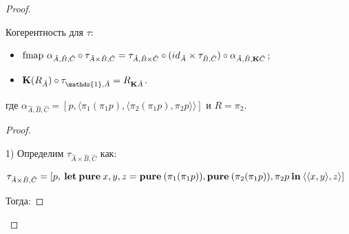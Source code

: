 \begin{proof}
\begin{lemma} Когерентность для $\tau$:

  \begin{itemize}
    \item $\text{fmap } \alpha_{\hat{A},\hat{B},\hat{C}} \circ \tau_{\hat{A} \times \hat{B}, \hat{C}} = \tau_{\hat{A}, \hat{B} \times \hat{C}} \circ (id_{\hat{A}} \times \tau_{\hat{B}, \hat{C}}) \circ \alpha_{\hat{A}, \hat{B}, {\bf K}\hat{C}}$;
    \item ${\bf K}(R_{\hat{A}}) \circ \tau_{\mathds{1}, \hat{A}} = R_{{\bf K}\hat{A}}$.
  \end{itemize}
  где $\alpha_{\hat{A},\hat{B},\hat{C}} = [p, \langle \pi_1 (\pi_1 p), \langle \pi_2 (\pi_1 p), \pi_2 p \rangle \rangle]$ и
  $R = \pi_2$.
\end{lemma}

\begin{proof}
  $ $

1) Определим $\tau_{\hat{A} \times \hat{B}, \hat{C}}$ как:

$\tau_{\hat{A} \times \hat{B}, \hat{C}} = [p, {\bf \: let \: pure \:} x,y,z = {\bf pure\:} (\pi_1 (\pi_1 p)), {\bf pure \:} (\pi_2 (\pi_1 p)), \pi_2 p {\: \bf in \:} \langle \langle x,y \rangle, z \rangle]$

\vspace{\baselineskip}

Тогда:

\vspace{\baselineskip}


\end{proof}
\end{proof}
